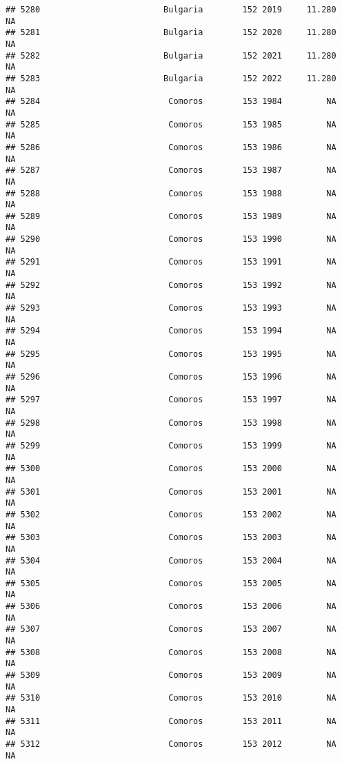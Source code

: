 \documentclass[
]{article}
\begin{document}
\begin{verbatim}
## 5280                         Bulgaria        152 2019     11.280         NA
## 5281                         Bulgaria        152 2020     11.280         NA
## 5282                         Bulgaria        152 2021     11.280         NA
## 5283                         Bulgaria        152 2022     11.280         NA
## 5284                          Comoros        153 1984         NA         NA
## 5285                          Comoros        153 1985         NA         NA
## 5286                          Comoros        153 1986         NA         NA
## 5287                          Comoros        153 1987         NA         NA
## 5288                          Comoros        153 1988         NA         NA
## 5289                          Comoros        153 1989         NA         NA
## 5290                          Comoros        153 1990         NA         NA
## 5291                          Comoros        153 1991         NA         NA
## 5292                          Comoros        153 1992         NA         NA
## 5293                          Comoros        153 1993         NA         NA
## 5294                          Comoros        153 1994         NA         NA
## 5295                          Comoros        153 1995         NA         NA
## 5296                          Comoros        153 1996         NA         NA
## 5297                          Comoros        153 1997         NA         NA
## 5298                          Comoros        153 1998         NA         NA
## 5299                          Comoros        153 1999         NA         NA
## 5300                          Comoros        153 2000         NA         NA
## 5301                          Comoros        153 2001         NA         NA
## 5302                          Comoros        153 2002         NA         NA
## 5303                          Comoros        153 2003         NA         NA
## 5304                          Comoros        153 2004         NA         NA
## 5305                          Comoros        153 2005         NA         NA
## 5306                          Comoros        153 2006         NA         NA
## 5307                          Comoros        153 2007         NA         NA
## 5308                          Comoros        153 2008         NA         NA
## 5309                          Comoros        153 2009         NA         NA
## 5310                          Comoros        153 2010         NA         NA
## 5311                          Comoros        153 2011         NA         NA
## 5312                          Comoros        153 2012         NA         NA

\end{verbatim}
\end{document}
